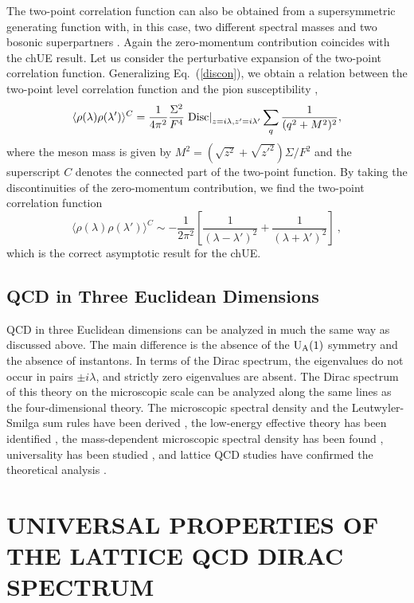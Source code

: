 The two-point correlation function can also be obtained from a
supersymmetric generating function with, in this case, two different
spectral masses and two bosonic superpartners \cite{OTV}.  Again the
zero-momentum contribution coincides with the chUE result. Let us
consider the perturbative expansion of the two-point correlation
function.  Generalizing Eq.~(\ref{discon}), we obtain a relation
between the two-point level correlation function and the pion
susceptibility \cite{OTV,carter},
\begin{equation}
  \langle \rho(\lambda) \rho(\lambda') \rangle^C =
  \frac 1{4\pi^2}\frac {\Sigma^2}{F^4}\left . {\rm Disc}
  \right |_{z = i\lambda, z'=i\lambda'}\sum_q\frac 1{(q^2 +M^2)^2},
\end{equation}
where the meson mass is given by
$M^2=(\sqrt{z^2}+\sqrt{z'^2})\Sigma/F^2$ and the 
superscript $C$ denotes the connected part of the two-point function.
By taking the discontinuities of the zero-momentum contribution, we
find the two-point correlation function \cite{OTV}
\begin{equation}
  \langle \rho(\lambda) \rho(\lambda') \rangle^C \sim
  -\frac 1{2\pi^2} \left [\frac 1{(\lambda-\lambda')^2}
  + \frac 1{(\lambda+\lambda')^2}\right ]\:,
\end{equation}
which is the correct asymptotic result for the chUE. 


\subsection{QCD in Three Euclidean Dimensions}

QCD in three Euclidean dimensions can be analyzed in much the same way as
discussed above. The main difference is the absence of the ${\rm
  U_A}(1)$ symmetry and the absence of instantons. In terms of the
Dirac spectrum, the eigenvalues do not occur in pairs $\pm i\lambda$,
and strictly zero eigenvalues are absent. The Dirac spectrum of this
theory on the microscopic scale can be analyzed along the same lines
as the four-dimensional theory.  The microscopic
spectral density and the Leutwyler-Smilga sum rules have been derived
\cite{VZ3,hilmoine}, the low-energy effective theory has been identified
\cite{VZ3,magnea}, the mass-dependent microscopic spectral density has
been found \cite{massuni,nagnish}, universality has been studied
\cite{Akem97,christian}, and lattice QCD studies have confirmed the
theoretical analysis \cite{Damg98b}.
   

\section{UNIVERSAL PROPERTIES OF THE LATTICE QCD DIRAC SPECTRUM}
\label{sec3}

